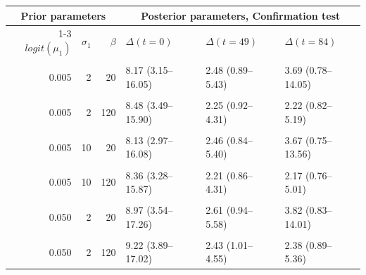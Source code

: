 \centering
\begin{tabular}{r|r|r|l|l|l}
\hline
\multicolumn{3}{c|}{Prior parameters} & \multicolumn{3}{c}{Posterior parameters, Confirmation test} \\
\cline{1-3} \cline{4-6}
$logit(\mu_1)$ & $\sigma_1$ & $\beta$ & $\Delta(t=0)$ & $\Delta(t=49)$  & $\Delta(t=84)$\\
\hline
\cellcolor{gray!6}{0.005} & \cellcolor{gray!6}{2} & \cellcolor{gray!6}{2} & \cellcolor{gray!6}{9.31 (2.571–23.33)} & \cellcolor{gray!6}{2.49 (0.355– 7.30)} & \cellcolor{gray!6}{4.61 (0.096–23.61)}\\
\hline
0.005 & 2 & 20 & 8.17 (3.15–16.05) & 2.48 (0.89– 5.43) & 3.69 (0.78–14.05)\\
\hline
\cellcolor{gray!6}{0.005} & \cellcolor{gray!6}{2} & \cellcolor{gray!6}{40} & \cellcolor{gray!6}{8.26 (3.27–15.76)} & \cellcolor{gray!6}{2.40 (0.91– 4.89)} & \cellcolor{gray!6}{3.04 (0.84– 9.98)}\\
\hline
0.005 & 2 & 120 & 8.48 (3.49–15.90) & 2.25 (0.92– 4.31) & 2.22 (0.82– 5.19)\\
\hline
\cellcolor{gray!6}{0.005} & \cellcolor{gray!6}{10} & \cellcolor{gray!6}{2} & \cellcolor{gray!6}{9.36 (2.292–24.94)} & \cellcolor{gray!6}{2.45 (0.348– 7.13)} & \cellcolor{gray!6}{4.53 (0.087–23.05)}\\
\hline
0.005 & 10 & 20 & 8.13 (2.97–16.08) & 2.46 (0.84– 5.40) & 3.67 (0.75–13.56)\\
\hline
\cellcolor{gray!6}{0.005} & \cellcolor{gray!6}{10} & \cellcolor{gray!6}{40} & \cellcolor{gray!6}{8.28 (3.14–15.76)} & \cellcolor{gray!6}{2.41 (0.90– 4.93)} & \cellcolor{gray!6}{3.07 (0.81–10.09)}\\
\hline
0.005 & 10 & 120 & 8.36 (3.28–15.87) & 2.21 (0.86– 4.31) & 2.17 (0.76– 5.01)\\
\hline
\cellcolor{gray!6}{0.050} & \cellcolor{gray!6}{2} & \cellcolor{gray!6}{2} & \cellcolor{gray!6}{11.16 (3.175–28.88)} & \cellcolor{gray!6}{2.54 (0.352– 7.32)} & \cellcolor{gray!6}{4.61 (0.086–23.02)}\\
\hline
0.050 & 2 & 20 & 8.97 (3.54–17.26) & 2.61 (0.94– 5.58) & 3.82 (0.83–14.01)\\
\hline
\cellcolor{gray!6}{0.050} & \cellcolor{gray!6}{2} & \cellcolor{gray!6}{40} & \cellcolor{gray!6}{8.95 (3.75–16.50)} & \cellcolor{gray!6}{2.56 (1.03– 5.08)} & \cellcolor{gray!6}{3.15 (0.93– 9.78)}\\
\hline
0.050 & 2 & 120 & 9.22 (3.89–17.02) & 2.43 (1.01– 4.55) & 2.38 (0.89– 5.36)\\

\end{tabular}
